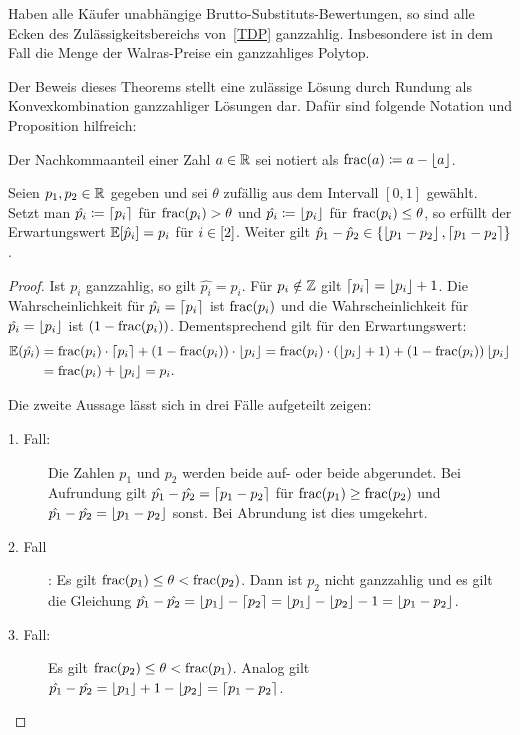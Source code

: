 \begin{theorem}\label{thm-walras-prices-integral-polytope}
	Haben alle Käufer unabhängige Brutto-Substituts-Bewertungen, so sind alle Ecken des Zulässigkeitsbereichs von~\eqref{TDP} ganzzahlig.
	Insbesondere ist in dem Fall die Menge der Walras-Preise ein ganzzahliges Polytop.
\end{theorem}
Der Beweis dieses Theorems stellt eine zulässige Lösung durch Rundung als Konvexkombination ganzzahliger Lösungen dar.
Dafür sind folgende Notation und Proposition hilfreich:
\begin{notation}
	Der Nachkommaanteil einer Zahl $a\in\mathbb{R}$ sei notiert als $\operatorname{frac}(a)\coloneqq a - \left\lfloor a \right\rfloor$.
\end{notation}
\begin{proposition}\label{prop-integral-polytop-helper}
	Seien $p_1,p_2\in\mathbb{R}$ gegeben und sei $\theta$ zufällig aus dem Intervall $[0,1]$ gewählt.
	Setzt man $\hat{p_i}\coloneqq \left\lceil p_i \right\rceil$ für $\operatorname{frac}(p_i)> \theta$ und $\hat{p_i}\coloneqq \left\lfloor p_i \right\rfloor$ für $\operatorname{frac}(p_i) \leq \theta$, so erfüllt der Erwartungswert $\mathbb{E}[\hat{p}_i] = p_i$ für $i\in\left[ 2 \right]$. Weiter gilt $\hat{p}_1 - \hat{p}_2 \in \{ \left\lfloor p_1 - p_2 \right\rfloor, \left\lceil p_1 - p_2 \right\rceil \}$.
\end{proposition}
\begin{proof}
	Ist $p_i$ ganzzahlig, so gilt $\hat{p_i} = p_i$.
	Für $p_i\notin\mathbb{Z}$ gilt $\left\lceil p_i \right\rceil = \left\lfloor p_i \right\rfloor + 1$.
	Die Wahrscheinlichkeit für $\hat{p_i} = \left\lceil p_i \right\rceil$ ist $\operatorname{frac}(p_i)$ und die Wahrscheinlichkeit für $\hat{p_i} = \left\lfloor p_i \right\rfloor$ ist $(1-\operatorname{frac}(p_i))$.
	Dementsprechend gilt für den Erwartungswert: \begin{align*}
	\mathbb{E}(\hat{p_i})
	&= \operatorname{frac}(p_i) \cdot \left\lceil p_i \right\rceil + (1-\operatorname{frac}(p_i))\cdot \left\lfloor p_i \right\rfloor
	= \operatorname{frac}(p_i)\cdot (\left\lfloor p_i \right\rfloor + 1) + (1-\operatorname{frac}(p_i)) \left\lfloor p_i \right\rfloor \\
	&= \operatorname{frac}(p_i) + \left\lfloor p_i \right\rfloor = p_i.
	\end{align*}
	
	Die zweite Aussage lässt sich in drei Fälle aufgeteilt zeigen:
	\begin{description}
		\item[1. Fall:] Die Zahlen $p_1$ und $p_2$ werden beide auf- oder beide abgerundet.
		Bei Aufrundung gilt $\hat{p_1} - \hat{p_2} = \left\lceil p_1 - p_2 \right\rceil$ für $\operatorname{frac}(p_1) \geq \operatorname{frac}(p_2)$ und $\hat{p_1} - \hat{p_2} = \left\lfloor p_1 - p_2 \right\rfloor$ sonst.
		Bei Abrundung ist dies umgekehrt.
		\item[2. Fall]: Es gilt $\operatorname{frac}(p_1) \leq \theta < \operatorname{frac}(p_2)$.
		Dann ist $p_2$ nicht ganzzahlig und es gilt die Gleichung $\hat{p_1} - \hat{p_2} = \left\lfloor p_1 \right\rfloor - \left\lceil p_2 \right\rceil = \left\lfloor p_1 \right\rfloor - \left\lfloor p_2 \right\rfloor - 1 = \left\lfloor p_1 - p_2 \right\rfloor$.
		\item[3. Fall:] Es gilt $\operatorname{frac}(p_2) \leq \theta < \operatorname{frac}(p_1)$. Analog gilt $\hat{p_1} - \hat{p_2} = \left\lfloor p_1 \right\rfloor + 1 - \left\lfloor p_2 \right\rfloor = \left\lceil p_1 - p_2 \right\rceil$.
	\end{description}
	\vspace{-0.5em}
\end{proof}

